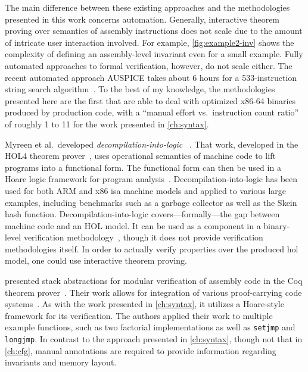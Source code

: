 The main difference between these existing approaches
and the methodologies presented in this work concerns automation.
Generally, interactive theorem proving over semantics of assembly instructions
does not scale due to the amount of intricate user interaction involved.
For example, \cref{fig:example2-inv} shows
the complexity of defining an assembly-level invariant even for a small example.
Fully automated approaches to formal verification, however, do not scale either.
The recent automated approach AUSPICE takes about 6 hours
for a 533-instruction string search algorithm~\citep{tan2015auspice}.
To the best of my knowledge,
the methodologies presented here are the first that are able to deal with
optimized x86-64 binaries produced by production code,
with a ``manual effort vs.\ instruction count ratio'' of roughly 1 to 11
for the work presented in \cref{ch:syntax}.

Myreen et al.\ developed \emph{decompilation-into-logic}~%
\citep{myreen2007hoare,myreen2008decompilation,myreen2012decompilation}.
That work, developed in the HOL4 theorem prover~\citep{slind2008brief},
uses operational semantics of machine code to lift programs into a functional form.
The functional form can then be used in a Hoare logic framework
for program analysis~\citep{myreen2007hoare}.
Decompilation-into-logic has been used for both ARM and x86 \ac{isa} machine models
and applied to various large examples,
including benchmarks such as a garbage collector as well as the Skein hash function.
Decompilation-into-logic covers---formally---the gap between machine code
and an HOL model.
It can be used as a component
in a binary-level verification methodology~\citep{sewell2013tvv},
though it does not provide verification methodologies itself.
In order to actually verify properties over the produced \ac{hol} model,
one could use interactive theorem proving.

\citet{feng2006modular,feng2005sbca} presented stack abstractions
for modular verification of assembly code
in the Coq theorem prover~\citep{chlipala2013certified}.
Their work allows for integration
of various proof-carrying code systems~\citep{necula1997proof}.
As with the work presented in \cref{ch:syntax},
it utilizes a Hoare-style framework for its verification.
The authors applied their work to multiple example functions,
such as two factorial implementations
as well as \lstinline[style=C]|setjmp| and \lstinline[style=C]|longjmp|.
In contrast to the approach presented in \cref{ch:syntax},
though not that in \cref{ch:cfg},
manual annotations are required to provide information
regarding invariants and memory layout.

